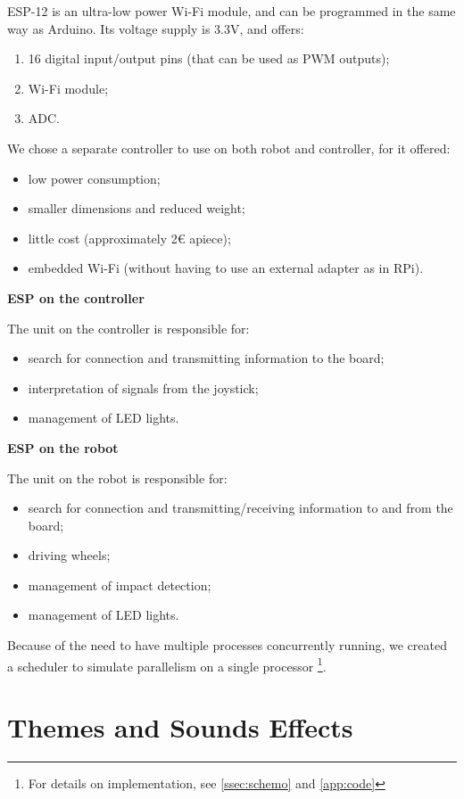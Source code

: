 \documentclass[a4paper,twoside]{book}
\begin{document}
\begin{appendices}
\beforelist* ESP-12  is an ultra-low power Wi-Fi module, and can be programmed in the same way as Arduino. Its voltage supply is 3.3V, and offers:
\begin{enumerate}
\item 16 digital input/output pins (that can be used as PWM outputs);
\item Wi-Fi module;
\item ADC.
\end{enumerate}
\afterlist
\beforelist We chose a separate controller to use on both robot and controller, for it offered:
\begin{itemize}
\item low power consumption; 
\item smaller dimensions and reduced weight;
\item little cost (approximately 2\euro{} apiece);
\item embedded Wi-Fi (without having to use an external adapter as in RPi).
\end{itemize}
\afterlist*

\textbf{ESP on the controller} 

\beforelist The unit on the controller is responsible for:
\begin{itemize}
\item search for connection and transmitting information to the board;
\item interpretation of signals from the joystick;
\item management of LED lights.
\end{itemize}
\afterlist*

\textbf{ESP on the robot} 

\beforelist The unit on the robot is responsible for:
\begin{itemize}
\item search for connection and transmitting/receiving information to and from the board;
\item driving wheels;
\item management of impact detection;
\item management of LED lights.
\end{itemize}
\afterlist*
Because of the need to have multiple processes concurrently running, we created a scheduler to simulate parallelism on a single processor%
\footnote {For details on implementation, see \autoref{ssec:schemo} and \autoref{app:code}}.

\section{Themes and Sounds Effects}
\label{app:noise}


\end{appendices}
\end{document}
